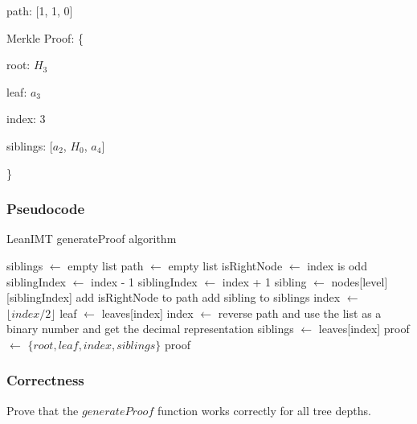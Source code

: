 \documentclass{article}
\begin{document}
path: [1, 1, 0]

Merkle Proof: \{

root: $H_3$

leaf: $a_3$

index: 3

siblings: [$a_2$, $H_0$, $a_4$]

\}

\subsubsection{Pseudocode}

\begin{algorithm}[H]
    \caption{LeanIMT generateProof algorithm}\label{generateProof}
    \begin{algorithmic}[1]
        \State siblings $\gets$ empty list 
        \State path $\gets$ empty list 
        \State isRightNode $\gets$ index is odd
         
        \State siblingIndex $\gets$ index - 1
        \Else {}
        \State siblingIndex $\gets$ index + 1
        \EndIf
        \State sibling $\gets$ nodes[level][siblingIndex]
        \State add isRightNode to path
        \State add sibling to siblings
        \EndIf
        \State index $\gets$ $\lfloor index/2 \rfloor$ 
        \EndFor
        \State leaf $\gets$ leaves[index]
        \State index $\gets$ reverse path and use the list as a binary number and get the decimal representation
        \State siblings $\gets$ leaves[index]
        \State proof $\gets$ $\{root, leaf , index, siblings \}$
        \State \Return proof
        \EndProcedure
    \end{algorithmic}
\end{algorithm}



\subsubsection{Correctness}

Prove that the $generateProof$ function works correctly for all tree depths.
\end{document}
